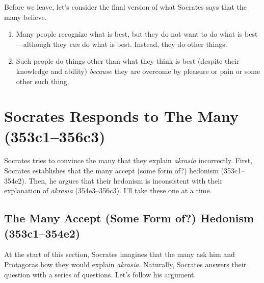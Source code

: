 \documentclass[12pt,letterpaper]{article}
\begin{document}
Before we leave, let's consider the final version of what Socrates says that the many believe.

\begin{enumerate}
    \item Many people recognize what is best, but they do not want to do what is best---although they \textit{can} do what is best.
        Instead, they do other things.
    \item Such people do things other than what they think is best (despite their knowledge and ability) \textit{because} they are overcome by pleasure or pain or some other such thing.
\end{enumerate}

\section*{Socrates Responds to The Many (353c1--356c3)}

Socrates tries to convince the many that they explain \textit{akrasia} incorrectly.
First, Socrates establishes that the many accept (some form of?) hedonism (353c1--354e2).
Then, he argues that their hedonism is inconsistent with their explanation of \textit{akrasia} (354e3--356c3).
I'll take these one at a time.

\subsection*{The Many Accept (Some Form of?) Hedonism (353c1--354e2)}

At the start of this section, Socrates imagines that the many ask him and Protagoras how they would explain \textit{akrasia}.
Naturally, Socrates answers their question with a series of questions.
Let's follow his argument.
\end{document}
